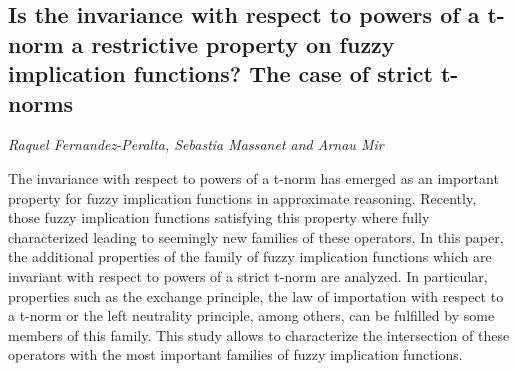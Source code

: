 \documentclass[../booklet.tex]{subfiles}
\begin{document}
\subsection[Is the invariance with respect to powers of a t-norm a restrictive property on fuzzy implication functions? The case of strict t-norms. {\it Raquel Fernandez-Peralta, Sebastia Massanet and Arnau Mir}]{Is the invariance with respect to powers of a t-norm a restrictive property on fuzzy implication functions? The case of strict t-norms}
  

\begin{center}
  {\it Raquel Fernandez-Peralta, Sebastia Massanet and Arnau Mir}
\end{center}



The invariance with respect to powers of a t-norm has emerged as an important property for fuzzy implication functions in approximate reasoning. Recently, those fuzzy implication functions satisfying this property where fully characterized leading to seemingly new families of these operators. In this paper, the additional properties of the family of fuzzy implication functions which are invariant with respect to powers of a strict t-norm are analyzed. In particular, properties such as the exchange principle, the law of importation with respect to a t-norm or the left neutrality principle, among others, can be fulfilled by some members of this family. This study allows to characterize the intersection of these operators with the most important families of fuzzy implication functions.  

\end{document}
